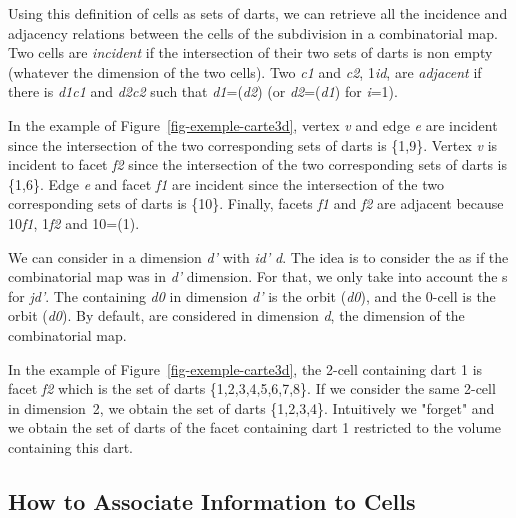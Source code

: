 Using this definition of cells as sets of darts, we can retrieve all the
incidence and adjacency relations between the cells of the subdivision
in a combinatorial map.  Two cells are \emph{incident} if the
intersection of their two sets of darts is non empty (whatever the
dimension of the two cells). Two  \emph{c1} and \emph{c2}, 
1\myleq{}\emph{i}\myleq{}\emph{d}, are \emph{adjacent} if there is 
\emph{d1}\myin{}\emph{c1} and \emph{d2}\myin{}\emph{c2} such that
\emph{d1}=\betai{}(\emph{d2}) (or \emph{d2}=\betai{}(\emph{d1}) 
for \emph{i}=1).

In the example of Figure~\ref{fig-exemple-carte3d}, vertex \emph{v} and
edge \emph{e} are incident since the intersection of the two corresponding
sets of darts is \{1,9\}\myneq{}\myemptyset{}. Vertex \emph{v} is incident to facet
\emph{f2} since the intersection of the two corresponding sets of darts is
\{1,6\}\myneq{}\myemptyset{}. Edge \emph{e} and facet \emph{f1} are incident
since the intersection of the two corresponding sets of darts is
\{10\}\myneq{}\myemptyset{}. Finally, facets \emph{f1} and \emph{f2} are adjacent
because 10\myin{}\emph{f1}, 1\myin{}\emph{f2} and 10=\betadeux{}(1).

We can consider  in a dimension \emph{d'} with  \emph{i}\myleq{}\emph{d'}\myleq{}
\emph{d}. The idea is to consider the  as if the combinatorial map
was in \emph{d'} dimension. For that, we only take into account the
\betaj{}s for \emph{j}\myleq{}\emph{d'}.  The  containing \emph{d0} in dimension
\emph{d'} is the orbit
\orbit{\betaun{},\myldots{},\betaimun{},\betaipun{},\myldots{},\betadprim{}}(\emph{d0}), and 
the 0-cell is the orbit (\emph{d0}).  By default,  are considered in
dimension \emph{d}, the dimension of the combinatorial map.

In the example of Figure~\ref{fig-exemple-carte3d}, the 2-cell
containing dart 1 is facet \emph{f2} which is the set of darts
\{1,2,3,4,5,6,7,8\}. If we consider the same 2-cell in dimension~2,
we obtain the set of darts \{1,2,3,4\}. Intuitively we "forget"
\betatrois{} and we obtain the set of darts of the facet containing dart
1 restricted to the volume containing this dart.

\subsection{How to Associate Information to Cells}
\label{ssec-associate-attributes}

